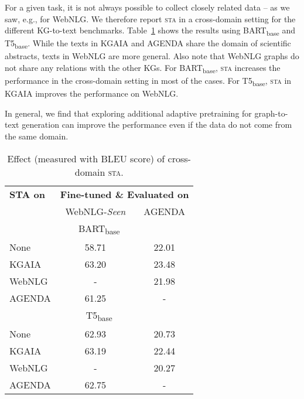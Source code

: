\documentclass[11pt]{article}
\begin{document}
For a given task, it is not always possible to collect closely related data -- as we saw, e.g., for WebNLG.
We therefore report \textsc{sta} in a cross-domain setting for the different KG-to-text benchmarks.
Table~\ref{tab:crossdomain_adddata} shows the results using BART\textsubscript{base} and T5\textsubscript{base}. While the texts in KGAIA and AGENDA share the domain of scientific abstracts, texts in WebNLG are more general. Also note that WebNLG graphs do not share any relations with the other KGs. For BART\textsubscript{base}, \textsc{sta} increases the performance in the cross-domain setting in most of the cases. For T5\textsubscript{base}, \textsc{sta} in KGAIA improves the performance on WebNLG.

In general, we find that exploring additional adaptive pretraining for graph-to-text generation can improve the performance even if the data do not come from the same domain.


\begin{table}[h]
\centering
{\renewcommand{\arraystretch}{0.8}
\begin{tabular}{lcc}  
\toprule
\textbf{STA on} & \multicolumn{2}{c}{\textbf{Fine-tuned \&{} Evaluated on}} \\
\cmidrule(lr){2-3}
 & WebNLG-\textit{Seen} & AGENDA \\
\midrule
\multicolumn{3}{c}{BART\textsubscript{base}} \\
\midrule
None & 58.71 & 22.01 \\
KGAIA & 63.20 & 23.48 \\
WebNLG & - & 21.98 \\
AGENDA & 61.25 & - \\

\midrule
\multicolumn{3}{c}{T5\textsubscript{base}} \\
\midrule
None & 62.93 & 20.73 \\
KGAIA & 63.19 & 22.44 \\
WebNLG & - & 20.27 \\
AGENDA & 62.75 & - \\

\bottomrule
\end{tabular}}
\caption{Effect (measured with BLEU score) of cross-domain \textsc{sta}.}
\label{tab:crossdomain_adddata}
\end{table}
\vspace{-5mm}
\end{document}
